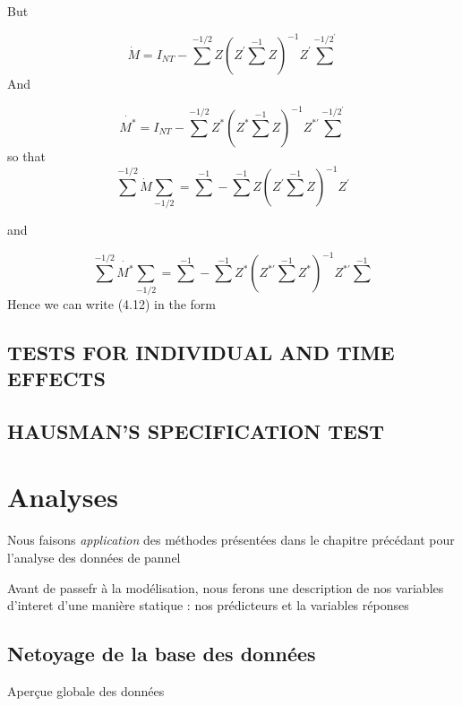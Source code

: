\documentclass[
]{book}
\begin{document}
But

\[ \dot{M}=I_{NT}-\sum^{-1/2} Z\left(Z^{\prime } \sum^{-1} Z \right)^{-1} Z^{\prime} \sum^{-1/2^{\prime}} \]
And

\[ \dot{M^*}=I_{NT}-\sum^{-1/2} Z^{*}\left(Z^{*} \sum^{-1} Z \right)^{-1} Z^{* \prime} \sum^{-1/2^{\prime}} \]
so that
\[\sum^{-1/2}\dot{M}\sum_{-1/2} =\sum^{-1}-\sum^{-1} Z \left(Z^{\prime}\sum^{-1}Z  \right)^{-1} Z^{\prime} \]

and

\[\sum^{-1/2}\dot{M^*}\sum_{-1/2} =\sum^{-1}-\sum^{-1} Z^* \left(Z^{*\prime}\sum^{-1}Z^*  \right)^{-1} Z^{*\prime} \sum^{-1} \]
Hence we can write (4.12) in the form

\hypertarget{tests-for-individual-and-time-effects}{%
\section{TESTS FOR INDIVIDUAL AND TIME EFFECTS}\label{tests-for-individual-and-time-effects}}

\hypertarget{hausmans-specification-test}{%
\section{HAUSMAN'S SPECIFICATION TEST}\label{hausmans-specification-test}}

\hypertarget{analyses}{%
\chapter{Analyses}\label{analyses}}

Nous faisons \emph{application} des méthodes présentées dans le chapitre précédant pour l'analyse des données de pannel

Avant de passefr à la modélisation, nous ferons une description de nos variables d'interet d'une manière statique : nos prédicteurs et la variables réponses

\hypertarget{netoyage-de-la-base-des-donnuxe9es}{%
\section{Netoyage de la base des données}\label{netoyage-de-la-base-des-donnuxe9es}}

Aperçue globale des données
\end{document}
